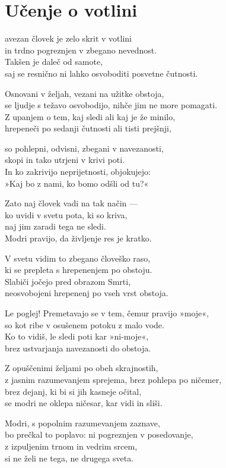 \cleartorecto
{}
\chapter{Učenje o votlini}

avezan človek je zelo skrit v votlini\\
in trdno pogreznjen v zbegano nevednost.\\
Takšen je daleč od samote,\\
saj se resnično ni lahko osvoboditi posvetne čutnosti.

Osnovani v željah, vezani na užitke obstoja,\\
se ljudje s težavo osvobodijo, nihče jim ne more pomagati.\\
Z upanjem o tem, kaj sledi ali kaj je že minilo,\\
hrepeneči po sedanji čutnosti ali tisti prejšnji,

\clearpage

so pohlepni, odvisni, zbegani v navezanosti,\\
skopi in tako utrjeni v krivi poti.\\
In ko zakrivijo neprijetnosti, objokujejo:\\
»Kaj bo z nami, ko bomo odšli od tu?«

Zato naj človek vadi na tak način —\\
ko uvidi v svetu pota, ki so kriva,\\
naj jim zaradi tega ne sledi.\\
Modri pravijo, da življenje res je kratko.

V svetu vidim to zbegano človeško raso,\\
ki se prepleta s hrepenenjem po obstoju.\\
Slabiči jočejo pred obrazom Smrti,\\
neosvobojeni hrepenenj po vseh vrst obstoja.

Le poglej! Premetavajo se v tem, čemur pravijo »moje«,\\
so kot ribe v osušenem potoku z malo vode.\\
Ko to vidiš, le sledi poti kar »ni-moje«,\\
brez ustvarjanja navezanosti do obstoja.

Z opuščenimi željami po obeh skrajnostih,\\
z jasnim razumevanjem sprejema, brez pohlepa po ničemer,\\
brez dejanj, ki bi si jih kasneje očital,\\
se modri ne oklepa ničesar, kar vidi in sliši.

Modri, s popolnim razumevanjem zaznave,\\
bo prečkal to poplavo: ni pogreznjen v posedovanje,\\
z izpuljenim trnom in vedrim srcem,\\
si ne želi ne tega, ne drugega sveta.

